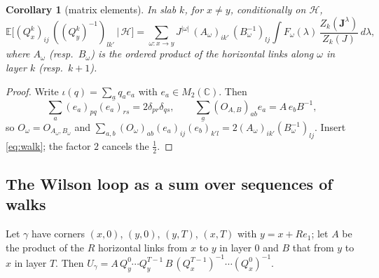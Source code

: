 \documentclass[11pt,a4paper]{article}
\theoremstyle{plain}
\newtheorem{corollary}[theorem]{Corollary}
\theoremstyle{remark}
\numberwithin{equation}{section}
\newcommand{\E}{\mathbb{E}}
\newcommand{\cH}{\mathcal{H}}
\newcommand{\bs}{\boldsymbol}
\begin{document}
\begin{corollary}[matrix elements]\label{cor:matrix}
In slab $k$, for $x\ne y$, conditionally on $\cH$,
\[
\E\big[(Q^k_x)_{ij}\,((Q^k_y)^{-1})_{lk'}\,\big|\,\cH\big]=\sum_{\omega:x\to y}J^{|\omega|}\,(A_\omega)_{ik'}\,(B_\omega^{-1})_{lj}
\int F_\omega(\lambda)\,\frac{Z_k(\bs J^\lambda)}{Z_k(J)}\,d\lambda ,
\]
where $A_\omega$ (resp.\ $B_\omega$) is the ordered product of the horizontal links along $\omega$ in layer $k$ (resp.\ $k+1$).
\end{corollary}
\begin{proof}
Write $\iota(q)=\sum_aq_ae_a$ with $e_a\in M_2(\mathbb C)$. Then
\[
\sum_a(e_a)_{pq}\overline{(e_a)_{rs}}=2\delta_{pr}\delta_{qs},\qquad \sum_a(O_{A,B})_{ab}e_a=A\,e_bB^{-1},
\]
so $O_\omega=O_{A_\omega,B_\omega}$ and $\sum_{a,b}(O_\omega)_{ab}(e_a)_{ij}\overline{(e_b)_{k'l}}=2(A_\omega)_{ik'}
(B_\omega^{-1})_{lj}$. Insert \eqref{eq:walk}; the factor $2$ cancels the $\frac12$.
\end{proof}

\subsection{The Wilson loop as a sum over sequences of walks}
Let $\gamma$ have corners $(x,0)$, $(y,0)$, $(y,T)$, $(x,T)$ with $y=x+Re_1$; let $A$ be the product of the $R$ horizontal links from
$x$ to $y$ in layer $0$ and $B$ that from $y$ to $x$ in layer $T$. Then
$U_\gamma=A\,Q^0_y\cdots Q^{T-1}_y\,B\,(Q^{T-1}_x)^{-1}\cdots(Q^0_x)^{-1}$.
\end{document}
